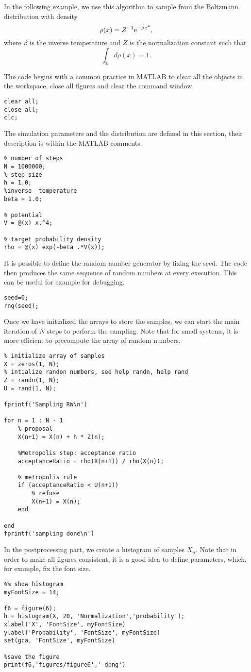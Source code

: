 \documentclass{scrartcl}
\newcommand{\R}{\mathbb{R}}
\begin{document}
In the following example, we use this algorithm to sample from the Boltzmann distribution with density
\[
\rho(x) = Z^{-1}{\rm e}^{-\beta x^4},
\]
where $\beta$ is the inverse temperature and $Z$ is the normalization constant such that
\[
\int_{\R} d\rho(x) = 1.
\]

The code begins with a common practice in MATLAB to clear all the objects in the workspace, close all figures and clear the command window.
\begin{verbatim}
clear all;
close all;
clc;
\end{verbatim}
The simulation parameters and the distribution are defined in this section, their description is within the MATLAB comments.
\begin{verbatim}
% number of steps 
N = 1000000;
% step size
h = 1.0;
%inverse  temperature 
beta = 1.0;

% potential
V = @(x) x.^4;

% target probability density
rho = @(x) exp(-beta .*V(x));
\end{verbatim}
It is possible to define the random number generator by fixing the seed. The code then produces the same sequence of random numbers at every execution. This can be useful for example for debugging.
\begin{verbatim}
seed=0;
rng(seed);
\end{verbatim}
Once we have initialized the arrays to store the samples, we can start the main iteration of $N$ steps to perform the sampling. Note that for small systems, it is more efficient to precompute the array of random numbers.
\begin{verbatim}
% initialize array of samples
X = zeros(1, N); 
% intialize randon numbers, see help randn, help rand
Z = randn(1, N);
U = rand(1, N);

fprintf('Sampling RW\n')

for n = 1 : N - 1    
    % proposal 
    X(n+1) = X(n) + h * Z(n);
    
    %Metropolis step: acceptance ratio
    acceptanceRatio = rho(X(n+1)) / rho(X(n));
    
    % metropolis rule
    if (acceptanceRatio < U(n+1))
        % refuse
        X(n+1) = X(n);
    end
    
end
fprintf('sampling done\n')
\end{verbatim}
In the postprocessing part, we create a histogram of samples $X_n$. Note that in order to make all figures consistent, it is a good idea to define parameters, which, for example, fix the font size. 
\begin{verbatim}
%% show histogram
myFontSize = 14;

f6 = figure(6);
h = histogram(X, 20, 'Normalization','probability');
xlabel('X', 'FontSize', myFontSize)
ylabel('Probability', 'FontSize', myFontSize)
set(gca, 'FontSize', myFontSize)

%save the figure
print(f6,'figures/figure6','-dpng')
\end{verbatim}
\end{document}
